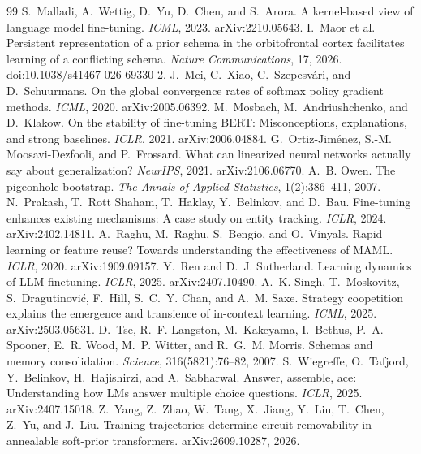 \documentclass[11pt]{article}
\begin{document}
\begin{thebibliography}{99}
 S.~Malladi, A.~Wettig, D.~Yu, D.~Chen, and S.~Arora. A kernel-based view of language model fine-tuning. \emph{ICML}, 2023. arXiv:2210.05643.
 I.~Maor et al. Persistent representation of a prior schema in the orbitofrontal cortex facilitates learning of a conflicting schema. \emph{Nature Communications}, 17, 2026. doi:10.1038/s41467-026-69330-2.
 J.~Mei, C.~Xiao, C.~Szepesv\'ari, and D.~Schuurmans. On the global convergence rates of softmax policy gradient methods. \emph{ICML}, 2020. arXiv:2005.06392.
 M.~Mosbach, M.~Andriushchenko, and D.~Klakow. On the stability of fine-tuning BERT: Misconceptions, explanations, and strong baselines. \emph{ICLR}, 2021. arXiv:2006.04884.
 G.~Ortiz-Jim\'enez, S.-M. Moosavi-Dezfooli, and P.~Frossard. What can linearized neural networks actually say about generalization? \emph{NeurIPS}, 2021. arXiv:2106.06770.
 A.~B. Owen. The pigeonhole bootstrap. \emph{The Annals of Applied Statistics}, 1(2):386--411, 2007.
 N.~Prakash, T.~Rott Shaham, T.~Haklay, Y.~Belinkov, and D.~Bau. Fine-tuning enhances existing mechanisms: A case study on entity tracking. \emph{ICLR}, 2024. arXiv:2402.14811.
 A.~Raghu, M.~Raghu, S.~Bengio, and O.~Vinyals. Rapid learning or feature reuse? Towards understanding the effectiveness of MAML. \emph{ICLR}, 2020. arXiv:1909.09157.
 Y.~Ren and D.~J. Sutherland. Learning dynamics of LLM finetuning. \emph{ICLR}, 2025. arXiv:2407.10490.
 A.~K. Singh, T.~Moskovitz, S.~Dragutinovi\'c, F.~Hill, S.~C.~Y. Chan, and A.~M. Saxe. Strategy coopetition explains the emergence and transience of in-context learning. \emph{ICML}, 2025. arXiv:2503.05631.
 D.~Tse, R.~F. Langston, M.~Kakeyama, I.~Bethus, P.~A. Spooner, E.~R. Wood, M.~P. Witter, and R.~G.~M. Morris. Schemas and memory consolidation. \emph{Science}, 316(5821):76--82, 2007.
 S.~Wiegreffe, O.~Tafjord, Y.~Belinkov, H.~Hajishirzi, and A.~Sabharwal. Answer, assemble, ace: Understanding how LMs answer multiple choice questions. \emph{ICLR}, 2025. arXiv:2407.15018.
 Z.~Yang, Z.~Zhao, W.~Tang, X.~Jiang, Y.~Liu, T.~Chen, Z.~Yu, and J.~Liu. Training trajectories determine circuit removability in annealable soft-prior transformers. arXiv:2609.10287, 2026.
\end{thebibliography}
\end{document}

